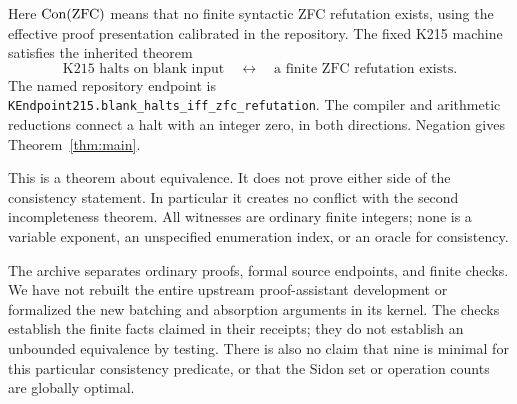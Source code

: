Here $\operatorname{Con}(\mathrm{ZFC})$ means that no finite syntactic ZFC refutation
exists, using the effective proof presentation calibrated in the
repository. The fixed K215 machine satisfies the inherited theorem
\[
 \text{K215 halts on blank input}
 \quad\longleftrightarrow\quad
 \text{a finite ZFC refutation exists}.
\]
The named repository endpoint is
\texttt{KEndpoint215.blank\_halts\_iff\_zfc\_refutation}.
The compiler and arithmetic reductions connect a halt with an integer
zero, in both directions. Negation gives Theorem~\ref{thm:main}.

This is a theorem about equivalence. It does not prove either side of
the consistency statement. In particular it creates no conflict with
the second incompleteness theorem. All witnesses are ordinary finite
integers; none is a variable exponent, an unspecified enumeration index,
or an oracle for consistency.

The archive separates ordinary proofs, formal source endpoints, and
finite checks. We have not rebuilt the entire upstream proof-assistant
development or formalized the new batching and absorption arguments in
its kernel. The checks establish the finite facts claimed in their
receipts; they do not establish an unbounded equivalence by testing.
There is also no claim that nine is minimal for this particular
consistency predicate, or that the Sidon set or operation counts are
globally optimal.

